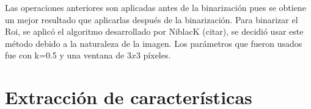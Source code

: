 Las operaciones anteriores son aplicadas antes de la binarizaci\'on pues se obtiene un mejor resultado que aplicarlas después de la binarizaci\'on.  
Para binarizar el Roi, se aplic\'o el algoritmo desarrollado por NiblacK (citar), se decidió usar este método debido a la naturaleza de la imagen. Los parámetros que fueron usados fue con k=0.5 y una ventana de $3x3$ p\'ixeles. 

 





\section{Extracci\'on de caracter\'isticas}\label{sec:ExtraccionCaracteristicas}


%


